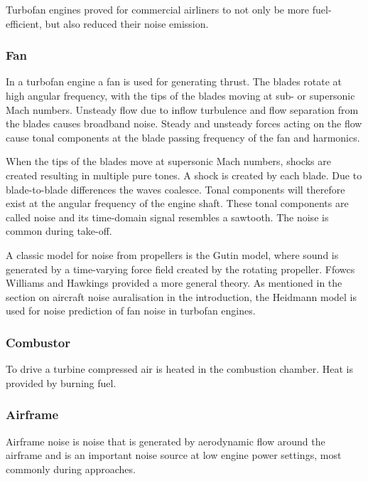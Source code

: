 Turbofan engines proved for commercial airliners to not only be more
fuel-efficient, but also reduced their noise emission.



\subsubsection{Fan}
In a turbofan engine a fan is used for generating thrust. The blades rotate at
high angular frequency, with the tips of the blades moving at sub- or supersonic
Mach numbers. Unsteady flow due to inflow turbulence and flow separation from
the blades causes broadband noise. Steady and unsteady forces acting on the flow
cause tonal components at the blade passing frequency of the fan and harmonics.

When the tips of the blades move at supersonic Mach numbers, shocks are created
resulting in multiple pure tones. A shock is created by each blade. Due to
blade-to-blade differences the waves coalesce. Tonal components will therefore
exist at the angular frequency of the engine shaft. These tonal components are
called  noise and its time-domain signal resembles a sawtooth.
The  noise is common during take-off.

A classic model for noise from propellers is the Gutin model, where sound is
generated by a time-varying force field created by the rotating propeller.
Ffowcs Williams and Hawkings provided a more general theory.
As mentioned in the section on aircraft noise auralisation in
the introduction, the Heidmann model is used for noise prediction of fan noise
in turbofan engines.

\subsubsection{Combustor}
To drive a turbine compressed air is heated in the combustion chamber. Heat is
provided by burning fuel.



\subsubsection{Airframe}
Airframe noise is noise that is generated by aerodynamic flow around the
airframe and is an important noise source at low engine power settings, most
commonly during approaches.






